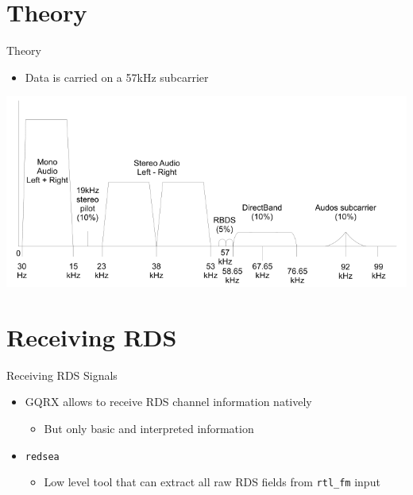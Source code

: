 \documentclass[10pt]{beamer}
\begin{document}
\section{Theory}
\begin{frame}{Theory}
\centering
\begin{itemize}
    \item Data is carried on a 57kHz subcarrier
\end{itemize}

\includegraphics[width=\textwidth]{fmspectrum.png}

\end{frame}

\section{Receiving RDS}
\begin{frame}[fragile]{Receiving RDS Signals}
\begin{itemize}
    \item GQRX allows to receive RDS channel information natively
    \begin{itemize}
        \item But only basic and interpreted information
    \end{itemize}
    \item \verb|redsea|
    \begin{itemize}
        \item Low level tool that can extract all raw RDS fields from \verb|rtl_fm| input
    \end{itemize}
\end{itemize}
\end{frame}

\end{document}
